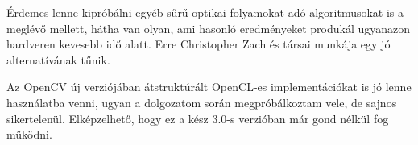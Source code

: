 Érdemes lenne kipróbálni egyéb sűrű optikai folyamokat adó algoritmusokat is a meglévő mellett, hátha van olyan, ami hasonló eredményeket produkál ugyanazon hardveren kevesebb idő alatt. Erre Christopher Zach és társai \cite{zach2007duality} munkája egy jó alternatívának tűnik.

Az OpenCV új verziójában átstruktúrált OpenCL-es implementációkat is jó lenne használatba venni, ugyan a dolgozatom során megpróbálkoztam vele, de sajnos sikertelenül. Elképzelhető, hogy ez a kész 3.0-s verzióban már gond nélkül fog működni.


